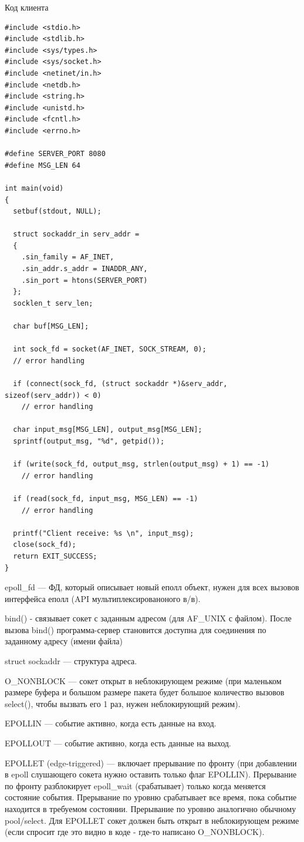 Код клиента
\begin{lstlisting}
#include <stdio.h>
#include <stdlib.h>
#include <sys/types.h>
#include <sys/socket.h>
#include <netinet/in.h>
#include <netdb.h>
#include <string.h>
#include <unistd.h>
#include <fcntl.h>
#include <errno.h>

#define SERVER_PORT 8080
#define MSG_LEN 64

int main(void)
{
  setbuf(stdout, NULL);

  struct sockaddr_in serv_addr =
  {
    .sin_family = AF_INET,
    .sin_addr.s_addr = INADDR_ANY,
    .sin_port = htons(SERVER_PORT)
  };
  socklen_t serv_len;

  char buf[MSG_LEN];

  int sock_fd = socket(AF_INET, SOCK_STREAM, 0);
  // error handling

  if (connect(sock_fd, (struct sockaddr *)&serv_addr, sizeof(serv_addr)) < 0)
    // error handling

  char input_msg[MSG_LEN], output_msg[MSG_LEN];
  sprintf(output_msg, "%d", getpid());

  if (write(sock_fd, output_msg, strlen(output_msg) + 1) == -1)
    // error handling

  if (read(sock_fd, input_msg, MSG_LEN) == -1)
    // error handling

  printf("Client receive: %s \n", input_msg);
  close(sock_fd);
  return EXIT_SUCCESS;
}
\end{lstlisting}

epoll\_fd --- ФД, который описывает новый еполл объект, нужен для всех вызовов интерфейса еполл (API мультиплексированоного в/в).

bind() - связывает сокет с заданным адресом (для AF\_UNIX с файлом). После вызова bind() программа-сервер становится доступна для соединения по заданному адресу (имени файла)

struct sockaddr --- структура адреса.

O\_NONBLOCK --- сокет открыт в неблокирующем режиме (при маленьком размере буфера и большом размере пакета будет большое количество вызовов select(), чтобы вызвать его 1 раз, нужен неблокирующий режим).

EPOLLIN — событие активно, когда есть данные на вход. 

EPOLLOUT — событие активно, когда есть данные на выход. 

EPOLLET (edge-triggered) — включает прерывание по фронту (при добавлении в epoll слушающего сокета нужно оставить только флаг EPOLLIN). Прерывание по фронту разблокирует epoll\_wait (срабатывает) только когда меняется состояние события. Прерывание по уровню срабатывает все время, пока событие находится в требуемом состоянии. Прерывание по уровню аналогично обычному pool/select. Для EPOLLET сокет должен быть открыт в неблокирующем режиме (если спросит где это видно в коде - где-то написано O\_NONBLOCK). 

